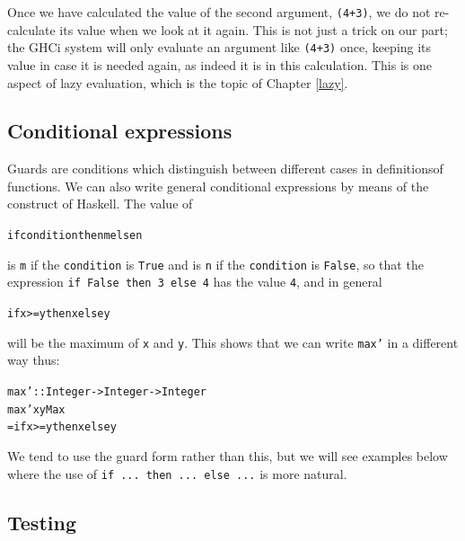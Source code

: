Once we have calculated the value of the second
argument, \texttt{(4+3)}, we do not re-calculate its value when we
look at it again. This is not just a trick on our part; the GHCi system will only 
evaluate an argument like \texttt{(4+3)} 
once, keeping its value in case it is needed again, as indeed it is in
this calculation. This is one aspect of lazy evaluation, which is the
topic of Chapter \ref{lazy}.

\subsection*{Conditional expressions}

Guards are conditions which distinguish between
different cases in definitions\break of functions. We
can also write general conditional expressions by means of
the construct of Haskell. The value of
\begin{alltt}
if condition then m else n
\end{alltt}
is \texttt{m} if the \texttt{condition} is \texttt{True} and is
\texttt{n} if the \texttt{condition} is \texttt{False}, so that the
expression \texttt{if False then 3 else 4}
has the value \texttt{4}, and in general
\begin{alltt}
if x >= y then x else y
\end{alltt}
will be the maximum of \texttt{x}
and \texttt{y}. This shows that we can write \texttt{max'} in a
different way thus:
\begin{alltt}
max' :: Integer -> Integer -> Integer
max' x yMax
  = if x >= y then x else y
\end{alltt}
We tend to use the guard form rather than this, but we will see examples
below where the use of \texttt{if ...\ then ...\ else ...{}} is more
natural.

\subsection*{Testing}

